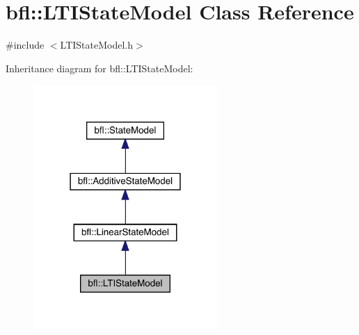 \hypertarget{classbfl_1_1LTIStateModel}{}\section{bfl\+:\+:L\+T\+I\+State\+Model Class Reference}
\label{classbfl_1_1LTIStateModel}


{\ttfamily \#include $<$L\+T\+I\+State\+Model.\+h$>$}



Inheritance diagram for bfl\+:\+:L\+T\+I\+State\+Model\+:
\nopagebreak
\begin{figure}[H]
\begin{center}
\leavevmode
\includegraphics[width=198pt]{classbfl_1_1LTIStateModel__inherit__graph}
\end{center}
\end{figure}
